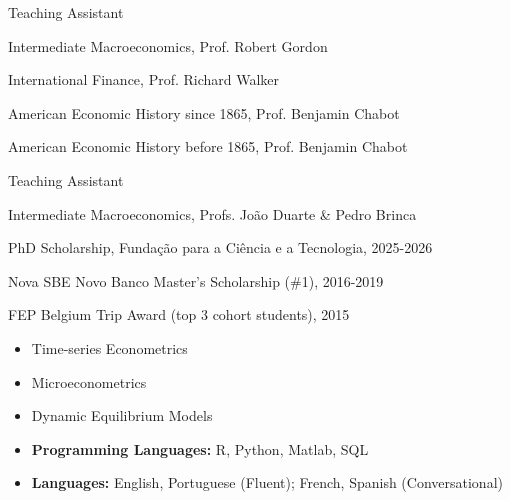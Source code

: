 \documentclass{practical-resume}
\begin{document}
	\begin{position}{Teaching Assistant}{}
		\item Intermediate Macroeconomics, Prof. Robert Gordon
		\item International Finance, Prof. Richard Walker
		\item American Economic History since 1865, Prof. Benjamin Chabot
		\item American Economic History before 1865, Prof. Benjamin Chabot
	\end{position}
	
	\begin{position}{Teaching Assistant}{}
		\item Intermediate Macroeconomics, Profs. João Duarte \& Pedro Brinca
	\end{position}

\begin{position}{}{}{}
	\item PhD Scholarship, Fundação para a Ciência e a Tecnologia, 2025-2026
	\item Nova SBE Novo Banco Master's Scholarship (\#1), 2016-2019
	\item FEP Belgium Trip Award (top 3 cohort students), 2015
\end{position}
	
\vspace{-1em}
	
	\begin{itemize}
		\item Time-series Econometrics
		
		\item Microeconometrics

		\item Dynamic Equilibrium Models	
	
		\item \textbf{Programming Languages:} R, Python, Matlab, SQL
	
		\item \textbf{Languages:} English, Portuguese (Fluent); French, Spanish (Conversational)

	\end{itemize}
		
\end{document}
